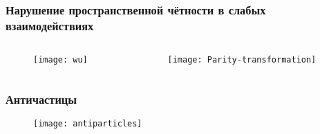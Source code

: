 \begin{frame}
    \frametitle{Нарушение пространственной чётности в слабых взаимодействиях}
    \begin{columns}
        \begin{column}{0.5\textwidth}
            \begin{figure}
                \begin{centering}
                    \texttt{[image: wu]}
                \end{centering}
            \end{figure}
        \end{column}
        \begin{column}{0.5\textwidth}
              {
            \begin{figure}
                \begin{centering}
                    \texttt{[image: Parity-transformation]}
                \end{centering}
            \end{figure}
        }
        \end{column}
    \end{columns}
\end{frame}

\begin{frame}
    \frametitle{Античастицы}
    \begin{figure}
        \begin{centering}
            \texttt{[image: antiparticles]}
        \end{centering}
    \end{figure}
\end{frame}

